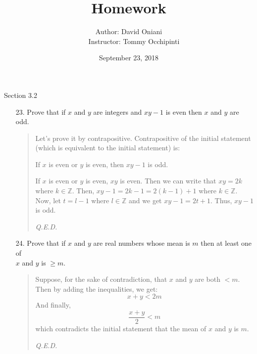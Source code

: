 \documentclass[12pt, a4paper]{article}                      %
\title{\bf{Homework \textnumero 5}}
\author{Author: David Oniani
\\
\ \ \ Instructor: Tommy Occhipinti}
\date{September 23, 2018}
\begin{document}
\maketitle

{\large Section 3.2}
\\

\begin{enumerate}
\item[23.]
Prove that if $x$ and $y$ are integers and $xy - 1$ is even then $x$ and $y$ are odd.
\begin{quote}
Let's prove it by contrapositive. Contrapositive of the initial statement (which is equivalent to the initial statement) is:
\begin{center}
If $x$ is even or $y$ is even, then $xy - 1$ is odd.
\end{center}
If $x$ is even or $y$ is even, $xy$ is even. Then we can write that $xy = 2k$ where $k \in \mathbb{Z}$.
Then, $xy - 1 = 2k - 1 = 2(k - 1) + 1$ where $k \in \mathbb{Z}$. Now, let $t = l - 1$ where $l \in \mathbb{Z}$
and we get $xy - 1 = 2t + 1$. Thus, $xy - 1$ is odd.
\begin{flushright}
\textit{Q.E.D.}
\end{flushright}
\end{quote}

\item[24.]
Prove that if $x$ and $y$ are real numbers whose mean is $m$ then at least one of\\
$x$ and $y$ is $\geq m$.
\begin{quote}
Suppose, for the sake of contradiction, that $x$ and $y$ are both $< m$.
Then by adding the inequalities, we get:
$$
x + y < 2m
$$
And finally,
$$
\dfrac{x + y}{2} < m
$$
which contradicts the initial statement that the mean of $x$ and $y$ is $m$.
\begin{flushright}
\textit{Q.E.D.}
\end{flushright}
\end{quote}


\end{enumerate}
\end{document}
